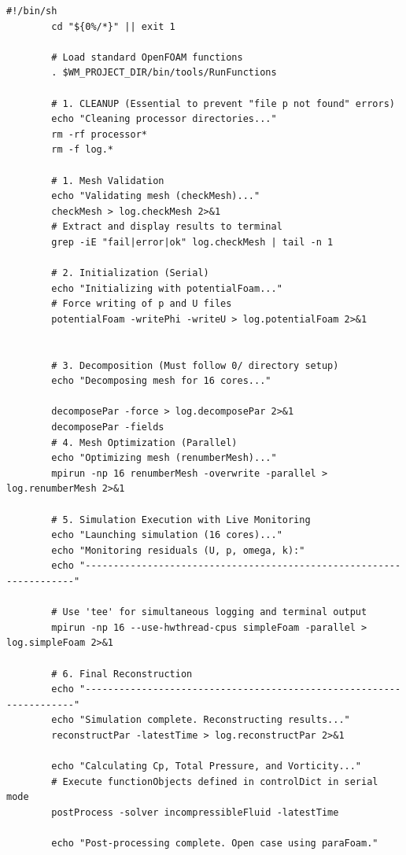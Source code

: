 \documentclass[a4paper]{article}
\begin{document}
	\begin{lstlisting}[style=bashStyle, caption={Script Allrun}]
		#!/bin/sh
		cd "${0%/*}" || exit 1
		
		# Load standard OpenFOAM functions
		. $WM_PROJECT_DIR/bin/tools/RunFunctions
		
		# 1. CLEANUP (Essential to prevent "file p not found" errors)
		echo "Cleaning processor directories..."
		rm -rf processor*
		rm -f log.*
		
		# 1. Mesh Validation
		echo "Validating mesh (checkMesh)..."
		checkMesh > log.checkMesh 2>&1
		# Extract and display results to terminal
		grep -iE "fail|error|ok" log.checkMesh | tail -n 1
		
		# 2. Initialization (Serial)
		echo "Initializing with potentialFoam..."
		# Force writing of p and U files
		potentialFoam -writePhi -writeU > log.potentialFoam 2>&1
		
		
		# 3. Decomposition (Must follow 0/ directory setup)
		echo "Decomposing mesh for 16 cores..."
		
		decomposePar -force > log.decomposePar 2>&1
		decomposePar -fields
		# 4. Mesh Optimization (Parallel)
		echo "Optimizing mesh (renumberMesh)..."
		mpirun -np 16 renumberMesh -overwrite -parallel > log.renumberMesh 2>&1
		
		# 5. Simulation Execution with Live Monitoring
		echo "Launching simulation (16 cores)..."
		echo "Monitoring residuals (U, p, omega, k):"
		echo "--------------------------------------------------------------------"
		
		# Use 'tee' for simultaneous logging and terminal output
		mpirun -np 16 --use-hwthread-cpus simpleFoam -parallel > log.simpleFoam 2>&1
		
		# 6. Final Reconstruction
		echo "--------------------------------------------------------------------"
		echo "Simulation complete. Reconstructing results..."
		reconstructPar -latestTime > log.reconstructPar 2>&1
		
		echo "Calculating Cp, Total Pressure, and Vorticity..."
		# Execute functionObjects defined in controlDict in serial mode
		postProcess -solver incompressibleFluid -latestTime
		
		echo "Post-processing complete. Open case using paraFoam."
	\end{lstlisting}
	
\end{document}
